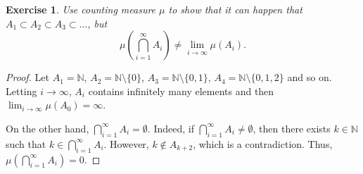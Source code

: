 \documentclass[11pt]{book}
\newtheorem{exercise}{Exercise}[chapter]
\theoremstyle{definition}
\numberwithin{equation}{chapter}
\begin{document}
\begin{exercise}
Use counting measure $\mu$ to show that it can happen that $A_1\subset A_2\subset A_3\subset\ldots$, but
$$
\mu\left(\bigcap_{i=1}^\infty A_i\right) \neq \lim_{i\to\infty}\mu(A_i).
$$
\end{exercise}
\begin{proof}
Let $A_1 = \mathbb{N}$, $A_2 = \mathbb{N} \setminus \{0\}$, $A_3 = \mathbb{N} \setminus \{0,1\}$, $A_4 = \mathbb{N} \setminus \{0,1,2\}$ and so on. Letting $i \to \infty$, $A_i$ contains infinitely many elements and then $\lim_{i\to\infty} \mu(A_0) = \infty$.

On the other hand, $\bigcap_{i=1}^\infty A_i = \emptyset$. Indeed, if $\bigcap_{i=1}^\infty A_i \neq \emptyset$, then there exists $k \in \mathbb{N}$ such that $k \in \bigcap_{i=1}^\infty A_i$. However, $k \notin A_{k+2}$, which is a contradiction. Thus, $\mu\left(\bigcap_{i=1}^\infty A_i\right) = 0$.
\end{proof}

\medskip
\end{document}
